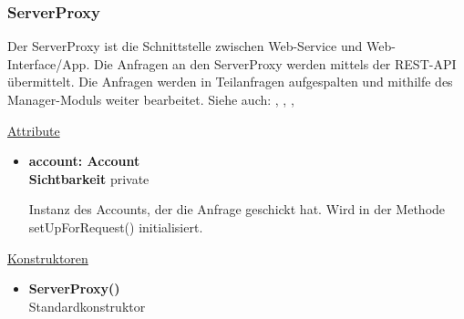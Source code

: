 \subsubsection{ServerProxy} \label{service:klasse:ServerProxy}
Der ServerProxy ist die Schnittstelle zwischen Web-Service und Web-Interface/App. Die Anfragen an den ServerProxy werden mittels der REST-API übermittelt. Die Anfragen werden in Teilanfragen aufgespalten und mithilfe des Manager-Moduls weiter bearbeitet. \newline
Siehe auch: , , , 

\underline{Attribute}
\begin{itemize}
\itemsep0pt
\item \textbf{account: Account} \hfill\\ 
\textbf{Sichtbarkeit} private

Instanz des Accounts, der die Anfrage geschickt hat. Wird in der Methode setUpForRequest() initialisiert.
\end{itemize}

\underline{Konstruktoren}
\begin{itemize}
\itemsep0pt
\item \textbf{ServerProxy()} \hfill\\
Standardkonstruktor
\end{itemize}

